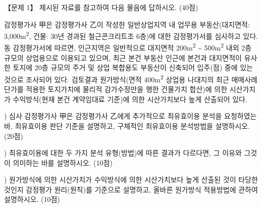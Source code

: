 \begin{longquestion}{【문제 1】}
제시된 자료를 참고하여 다음 물음에 답하시오. (40점) \par
\begin{framedtext}
감정평가사 甲은 감정평가사 乙이 작성한 일반상업지역 내 업무용 부동산(대지면적: 3,000m\textsuperscript{2}, 건물: 30년 경과된 철근콘크리트조 6층)에 대한 감정평가서를 심사하고 있다. 동 감정평가서에 따르면, 인근지역은 일반적으로 대지면적 200m\textsuperscript{2} \textasciitilde{} 500m\textsuperscript{2} 내외 2층 규모의 상업용으로 이용되고 있으며, 최근 본건 부동산 인근에 본건과 대지면적이 유사한 토지에 20층 규모의 주거 및 상업 복합용도 부동산이 신축되어 입주(점) 중에 있는 것으로 조사되어 있다. 검토결과 원가방식(면적 400m\textsuperscript{2} 상업용 나대지의 최근 매매사례 단가를 적용한 토지가치에 물리적 감가수정만을 행한 건물가치 합산)에 의한 시산가치가 수익방식(현재 본건 계약임대료 기준)에 의한 시산가치보다 높게 산출되어 있다.
\end{framedtext}
\medskip{}) 심사 감정평가사 甲은 감정평가사 乙에게 추가적으로 최유효이용 분석을 요청하였는 바, 최유효이용 판단 기준을 설명하고, 구체적인 최유효이용 분석방법을 설명하시오. (20점) \par
\medskip{}) 최유효이용에 대한 두 가지 분석 유형(방법)에 따른 결과가 다르다면, 그 이유와 그것이 의미하는 바를 설명하시오. (10점) \par
\medskip{}) 원가방식에 의한 시산가치가 수익방식에 의한 시산가치보다 높게 산출된 것이 타당한 것인지 감정평가 원리(원칙)를 기준으로 설명하고, 올바른 원가방식 적용방법에 관하여 설명하시오. (10점) \par
\end{longquestion}
